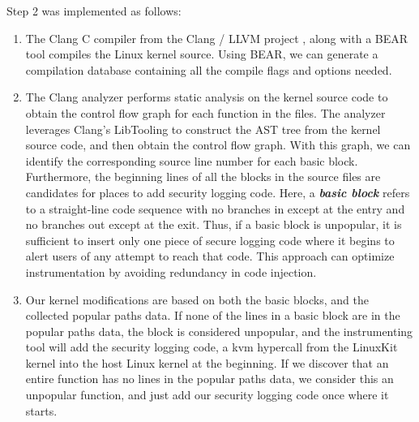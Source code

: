 Step 2 was implemented as follows: 
\begin{enumerate}
	\item The Clang C compiler from the Clang / LLVM project \cite{llvm}, along with a BEAR \cite{bear} tool compiles the Linux kernel source. Using BEAR, we can generate a compilation database containing all the compile flags and options needed. 
	\item The Clang analyzer performs static analysis on the kernel source code to obtain the control flow graph for each function in the files. The analyzer leverages Clang’s LibTooling \cite{clang-libtooling} to construct the AST tree from the kernel source code, and then obtain the control flow graph. With this graph, we can identify the corresponding source line number for each basic block. Furthermore, the beginning lines of all the blocks in the source files are candidates for places to add security logging code. Here, a \textbf{\textit{basic block}} refers to a straight-line code sequence with no branches in except at the entry and no branches out except at the exit. Thus, if a basic block is unpopular, it is sufficient to insert only one piece of secure logging code where it begins to alert users of any attempt to reach that code. This approach can optimize instrumentation by  avoiding redundancy in code injection. 
	\item Our kernel modifications are based on both the basic blocks, and the collected popular paths data. If none of the lines in a basic block are in the popular paths data, the block is considered unpopular, and the  instrumenting tool will add the security logging code, a kvm hypercall from the LinuxKit kernel into the host Linux kernel at the beginning. If we discover that an entire function has no lines in the popular paths data, we consider this an unpopular function, and just add our security logging code once where it starts.  
\end{enumerate}

